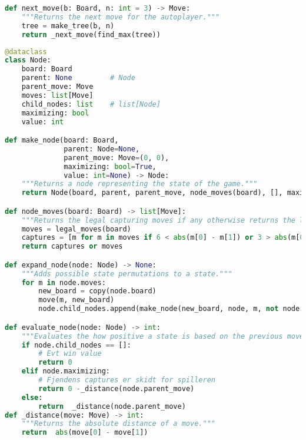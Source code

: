 \begin{lstlisting}[language=Python, caption={next\_move}, label={code:next}]
def next_move(b: Board, n: int = 3) -> Move:
    """Returns the next move for the autoplayer."""
    tree = make_tree(b, n)
    return _next_move(find_max(tree))
\end{lstlisting}
\begin{lstlisting}[language=Python, caption={Node}, label={code:node}]
@dataclass
class Node:
    board: Board
    parent: None         # Node
    parent_move: Move
    moves: list[Move]
    child_nodes: list    # list[Node]
    maximizing: bool
    value: int

def make_node(board: Board,
              parent: Node=None,
              parent_move: Move=(0, 0),
              maximizing: bool=True,
              value: int=None) -> Node: 
    """Returns a node representing the state of the game."""
    return Node(board, parent, parent_move, node_moves(board), [], maximizing, value)

def node_moves(board: Board) -> list[Move]:
    """Returns the legal capturing moves if any otherwise returns the legal moves."""
    moves = legal_moves(board)
    captures = [m for m in moves if 6 < abs(m[0] - m[1]) or 3 > abs(m[0] - m[1])]
    return captures or moves

def expand_node(node: Node) -> None:
    """Adds possible state permutations to a state."""
    for m in node.moves:    
        new_board = copy(node.board)
        move(m, new_board)
        node.child_nodes.append(make_node(new_board, node, m, not node.maximizing))

def evaluate_node(node: Node) -> int:
    """Evaluates the how positive a state is based on the previous move (the enemy move)."""
    if node.child_nodes == []:
        # Evt win value
        return 0
    elif node.maximizing:
        # Fjendens captures er skidt for spilleren
        return 0 -_distance(node.parent_move)
    else:
        return  _distance(node.parent_move)
def _distance(move: Move) -> int:
    """Returns the absolute distance of a move."""
    return  abs(move[0] - move[1])
\end{lstlisting}
